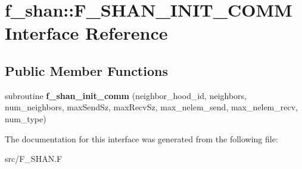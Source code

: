 \hypertarget{interfacef__shan_1_1F__SHAN__INIT__COMM}{}\section{f\+\_\+shan\+:\+:F\+\_\+\+S\+H\+A\+N\+\_\+\+I\+N\+I\+T\+\_\+\+C\+O\+MM Interface Reference}
\label{interfacef__shan_1_1F__SHAN__INIT__COMM}
\subsection*{Public Member Functions}
\begin{DoxyCompactItemize}
\item 
subroutine {\bfseries f\+\_\+shan\+\_\+init\+\_\+comm} (neighbor\+\_\+hood\+\_\+id, neighbors, num\+\_\+neighbors, max\+Send\+Sz, max\+Recv\+Sz, max\+\_\+nelem\+\_\+send, max\+\_\+nelem\+\_\+recv, num\+\_\+type)\hypertarget{interfacef__shan_1_1F__SHAN__INIT__COMM_ae4b07a43d19317d1d1356a40e15d8d34}{}\label{interfacef__shan_1_1F__SHAN__INIT__COMM_ae4b07a43d19317d1d1356a40e15d8d34}

\end{DoxyCompactItemize}


The documentation for this interface was generated from the following file\+:\begin{DoxyCompactItemize}
\item 
src/F\+\_\+\+S\+H\+A\+N.\+F\end{DoxyCompactItemize}
